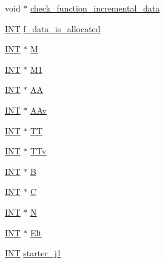 \begin{DoxyCompactItemize}
\item 
void $\ast$ \mbox{\hyperlink{classrecoordinatize_acbac3a8d02e4356dcaa0c0af45180ed5}{check\+\_\+function\+\_\+incremental\+\_\+data}}
\item 
\mbox{\hyperlink{galois_8h_a09fddde158a3a20bd2dcadb609de11dc}{I\+NT}} \mbox{\hyperlink{classrecoordinatize_a6274c4c742e643740bb3e5f80ef9f573}{f\+\_\+data\+\_\+is\+\_\+allocated}}
\item 
\mbox{\hyperlink{galois_8h_a09fddde158a3a20bd2dcadb609de11dc}{I\+NT}} $\ast$ \mbox{\hyperlink{classrecoordinatize_a5afb3edbd0364ec3dcaef359c7aba3d7}{M}}
\item 
\mbox{\hyperlink{galois_8h_a09fddde158a3a20bd2dcadb609de11dc}{I\+NT}} $\ast$ \mbox{\hyperlink{classrecoordinatize_aee3de1146079a51f10d7e8bfd5006744}{M1}}
\item 
\mbox{\hyperlink{galois_8h_a09fddde158a3a20bd2dcadb609de11dc}{I\+NT}} $\ast$ \mbox{\hyperlink{classrecoordinatize_a42ff7e3d9df08e1bdaea9e3001a58152}{AA}}
\item 
\mbox{\hyperlink{galois_8h_a09fddde158a3a20bd2dcadb609de11dc}{I\+NT}} $\ast$ \mbox{\hyperlink{classrecoordinatize_a39aeb49e5e889044b47754c62ac9810d}{A\+Av}}
\item 
\mbox{\hyperlink{galois_8h_a09fddde158a3a20bd2dcadb609de11dc}{I\+NT}} $\ast$ \mbox{\hyperlink{classrecoordinatize_a753a299deacf9bfab4a5f2b63223f53f}{TT}}
\item 
\mbox{\hyperlink{galois_8h_a09fddde158a3a20bd2dcadb609de11dc}{I\+NT}} $\ast$ \mbox{\hyperlink{classrecoordinatize_ad4d777c81681afe914bed0daa1ba5370}{T\+Tv}}
\item 
\mbox{\hyperlink{galois_8h_a09fddde158a3a20bd2dcadb609de11dc}{I\+NT}} $\ast$ \mbox{\hyperlink{classrecoordinatize_aa9483bc545f6807c89d3ff51f3dd956b}{B}}
\item 
\mbox{\hyperlink{galois_8h_a09fddde158a3a20bd2dcadb609de11dc}{I\+NT}} $\ast$ \mbox{\hyperlink{classrecoordinatize_a9bc4143e827cfa834694cc825f2f9407}{C}}
\item 
\mbox{\hyperlink{galois_8h_a09fddde158a3a20bd2dcadb609de11dc}{I\+NT}} $\ast$ \mbox{\hyperlink{classrecoordinatize_aefec54fcfbdeec8bce96954abf0388a6}{N}}
\item 
\mbox{\hyperlink{galois_8h_a09fddde158a3a20bd2dcadb609de11dc}{I\+NT}} $\ast$ \mbox{\hyperlink{classrecoordinatize_a89f01f4e5cd89189d13028c97b6e656b}{Elt}}
\item 
\mbox{\hyperlink{galois_8h_a09fddde158a3a20bd2dcadb609de11dc}{I\+NT}} \mbox{\hyperlink{classrecoordinatize_a258adcfebecc4074effce912a0305419}{starter\+\_\+j1}}

\end{DoxyCompactItemize}
